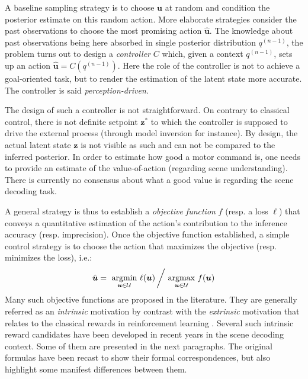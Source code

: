\documentclass[12pt,twoside,openright]{article}
\begin{document}
A baseline sampling strategy is to choose $\boldsymbol{u}$ at random and condition the posterior  estimate on this random action. 
More elaborate strategies consider the past observations
to choose the most promising action $\hat{\boldsymbol{u}}$. %
The knowledge about past observations being here absorbed in single posterior distribution $q^{(n-1)}$, the problem turns out to design  a \emph{controller} $C$ which, given a context $q^{(n-1)}$, sets up an action $\hat{\boldsymbol{u}} = C(q^{(n-1)})$. Here the role of the controller is not to achieve a goal-oriented task, but to render the estimation of the latent state more accurate. The controller is said \emph{perception-driven}. 

The design of such a controller is not straightforward. On contrary to classical control, there is not definite setpoint $\boldsymbol{z}^*$ to which the controller is supposed to drive the external process (through model inversion for instance). By design, the actual latent state $\boldsymbol{z}$ is not visible as such and can not be compared to the inferred posterior. In order to estimate how good a motor command is, one needs to provide an estimate of the value-of-action (regarding scene understanding). There is currently no consensus about what a good value is regarding the scene decoding task. 

A general strategy is thus to establish a \emph{objective function} $f$ (resp. a loss $\ell$) that conveys a quantitative estimation of the action's contribution to the inference accuracy (resp. imprecision). Once the objective function established, a simple control strategy is to choose the action that maximizes the objective (resp. minimizes the loss), i.e.:
\begin{align}
\hat{\boldsymbol{u}} = \underset{\boldsymbol{u}\in\mathcal{U}}{\text{ argmin }}  \ell(\boldsymbol{u})\left/ \underset{\boldsymbol{u}\in\mathcal{U}}{\text{ argmax }}  f(\boldsymbol{u})\right.
\end{align}
Many such objective functions are proposed in the literature. They are generally referred as an \emph{intrinsic} motivation \citep{oudeyer2008can} by contrast with the \emph{extrinsic} motivation that relates to the classical rewards in reinforcement learning \citep{sutton1998reinforcement}. {\color{Purple} Several such intrinsic reward candidates have been developed in recent years in the scene decoding context. Some of them are presented in the next paragraphs. The original formulas have been recast to show their formal correspondences, but also highlight some manifest differences between them.}
\end{document}
